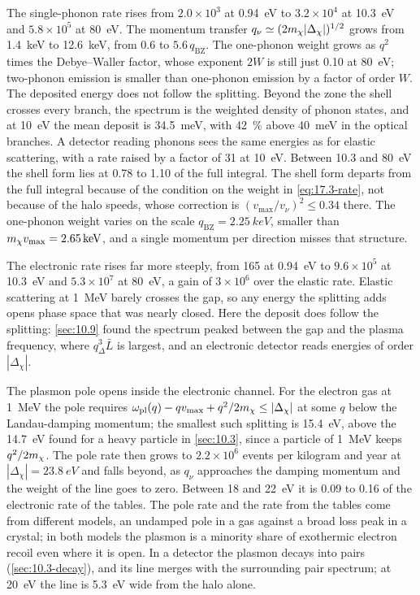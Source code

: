 The single-phonon rate rises from $2.0\times10^3$ at \SI{0.94}{eV} to $3.2\times10^4$ at \SI{10.3}{eV} and $5.8\times10^5$ at \SI{80}{eV}. The momentum transfer $q_\nu \simeq (2m_{\chi}|\Delta_\chi|)^{1/2}$ grows from \SI{1.4}{keV} to \SI{12.6}{keV}, from $0.6$ to $5.6\,q_{\mathrm{BZ}}$. The one-phonon weight grows as $q^2$ times the Debye--Waller factor, whose exponent $2W$ is still just 0.10 at \SI{80}{eV}; two-phonon emission is smaller than one-phonon emission by a factor of order $W$. The deposited energy does not follow the splitting. Beyond the zone the shell crosses every branch, the spectrum is the weighted density of phonon states, and at \SI{10}{eV} the mean deposit is \SI{34.5}{meV}, with \SI{42}{\percent} above \SI{40}{meV} in the optical branches. A detector reading phonons sees the same energies as for elastic scattering, with a rate raised by a factor of 31 at \SI{10}{eV}. Between 10.3 and \SI{80}{eV} the shell form lies at 0.78 to 1.10 of the full integral. The shell form departs from the full integral because of the condition on the weight in \cref{eq:17.3-rate}, not because of the halo speeds, whose correction is $(v_{\mathrm{max}}/v_\nu)^2 \le 0.34$ there. The one-phonon weight varies on the scale $q_{\mathrm{BZ}} = \SI{2.25}{keV}$, smaller than $m_{\chi} v_{\mathrm{max}} = \SI{2.65}{keV}$, and a single momentum per direction misses that structure.

The electronic rate rises far more steeply, from 165 at \SI{0.94}{eV} to $9.6\times10^5$ at \SI{10.3}{eV} and $5.3\times10^7$ at \SI{80}{eV}, a gain of $3\times10^6$ over the elastic rate. Elastic scattering at \SI{1}{MeV} barely crosses the gap, so any energy the splitting adds opens phase space that was nearly closed. Here the deposit does follow the splitting: \cref{sec:10.9} found the spectrum peaked between the gap and the plasma frequency, where $q_\Delta^3\bar L$ is largest, and an electronic detector reads energies of order $|\Delta_\chi|$.

The plasmon pole opens inside the electronic channel. For the electron gas at \SI{1}{MeV} the pole requires $\omega_{\mathrm{pl}}(q) - qv_{\mathrm{max}} + q^2/2m_{\chi} \le |\Delta_\chi|$ at some $q$ below the Landau-damping momentum; the smallest such splitting is \SI{15.4}{eV}, above the \SI{14.7}{eV} found for a heavy particle in \cref{sec:10.3}, since a particle of \SI{1}{MeV} keeps $q^2/2m_{\chi}$. The pole rate then grows to $2.2\times10^6$ events per kilogram and year at $|\Delta_\chi| = \SI{23.8}{eV}$ and falls beyond, as $q_\nu$ approaches the damping momentum and the weight of the line goes to zero. Between 18 and \SI{22}{eV} it is 0.09 to 0.16 of the electronic rate of the tables. The pole rate and the rate from the tables come from different models, an undamped pole in a gas against a broad loss peak in a crystal; in both models the plasmon is a minority share of exothermic electron recoil even where it is open. In a detector the plasmon decays into pairs (\cref{sec:10.3-decay}), and its line merges with the surrounding pair spectrum; at \SI{20}{eV} the line is \SI{5.3}{eV} wide from the halo alone.

